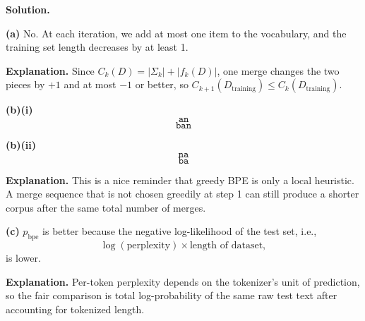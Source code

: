 \documentclass[10pt]{article}
\begin{document}
\textbf{Solution.}

\textbf{(a)} No. At each iteration, we add at most one item to the vocabulary, and the training set
length decreases by at least 1.

\textbf{Explanation.} Since \(C_k(D)=|\Sigma_k|+|f_k(D)|\), one merge changes the two pieces by \(+1\) and at most \(-1\) or better, so \(C_{k+1}(D_{\mathrm{training}})\le C_k(D_{\mathrm{training}})\).

\textbf{(b)(i)}
\[
\texttt{an}
\]
\[
\texttt{ban}
\]

\textbf{(b)(ii)}
\[
\texttt{na}
\]
\[
\texttt{ba}
\]

\textbf{Explanation.} This is a nice reminder that greedy BPE is only a local heuristic. A merge sequence that is not chosen greedily at step 1 can still produce a shorter corpus after the same total number of merges.

\textbf{(c)} \(p_{\mathrm{bpe}}\) is better because the negative log-likelihood of the test set, i.e.,
\[
\log(\mathrm{perplexity}) \times \text{length of dataset},
\]
is lower.

\textbf{Explanation.} Per-token perplexity depends on the tokenizer's unit of prediction, so the fair comparison is total log-probability of the same raw test text after accounting for tokenized length.
\end{document}
